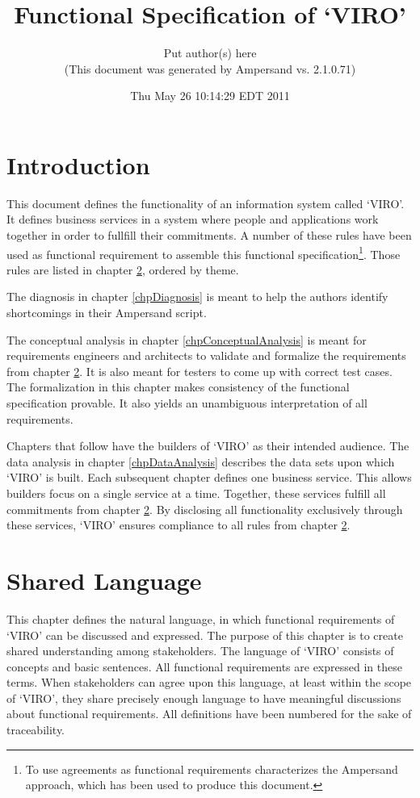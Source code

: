 \documentclass[10pt,a4paper]{report}              %
\title{Functional Specification of `VIRO'}
\author{Put author(s) here\\(This document was generated by Ampersand vs. 2.1.0.71)}
\date{Thu May 26 10:14:29 EDT 2011}
\theoremstyle{plain}\theorembodyfont{\rmfamily}\newtheorem{definition}{Definition}[section]
\theoremstyle{plain}\theorembodyfont{\rmfamily}\newtheorem{designrule}[definition]{Requirement}
\begin{document}
\maketitle

\tableofcontents

\chapter{Introduction}\label{chpIntro}

This document defines the functionality of an information system called `VIRO'. It defines business services in a system where people and applications work together in order to fullfill their commitments. A number of these rules have been used as functional requirement to assemble this functional specification\footnote{To use agreements as functional requirements characterizes the Ampersand approach, which has been used to produce this document. }. Those rules are listed in chapter \ref{chpFunctionalRequirements}, ordered by theme. 

The diagnosis in chapter \ref{chpDiagnosis} is meant to help the authors identify shortcomings in their Ampersand script.

The conceptual analysis in chapter \ref{chpConceptualAnalysis} is meant for requirements engineers and architects to validate and formalize the requirements from chapter \ref{chpFunctionalRequirements}. It is also meant for testers to come up with correct test cases. The formalization in this chapter makes consistency of the functional specification provable. It also yields an unambiguous interpretation of all requirements.

Chapters that follow have the builders of `VIRO' as their intended audience. The data analysis in chapter \ref{chpDataAnalysis} describes the data sets upon which `VIRO' is built. Each subsequent chapter defines one business service. This allows builders focus on a single service at a time. Together, these services fulfill all commitments from chapter \ref{chpFunctionalRequirements}. By disclosing all functionality exclusively through these services, `VIRO' ensures compliance to all rules from chapter \ref{chpFunctionalRequirements}. 

\chapter{Shared Language}\label{chpFunctionalRequirements}

This chapter defines the natural language, in which functional requirements of `VIRO' can be discussed and expressed. The purpose of this chapter is to create shared understanding among stakeholders. The language of `VIRO' consists of concepts and basic sentences. All functional requirements are expressed in these terms. When stakeholders can agree upon this language, at least within the scope of `VIRO', they share precisely enough language to have meaningful discussions about functional requirements. All definitions have been numbered for the sake of traceability. 
\end{document}
